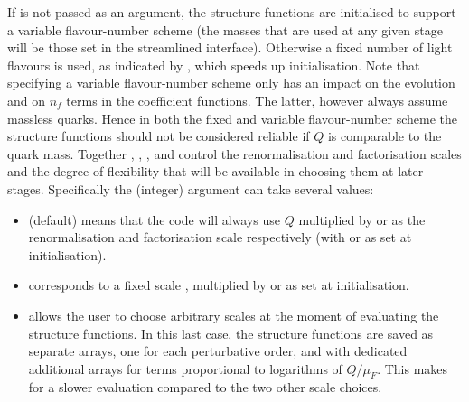 If  is not passed as an argument, the structure functions
are initialised to support a variable flavour-number scheme (the
masses that are used at any given stage will be those set in the
streamlined interface).
%
Otherwise a fixed number of light flavours is used, as indicated by
, which speeds up initialisation.
%
Note that specifying a variable flavour-number scheme only has an
impact on the evolution and on $n_f$ terms in the coefficient
functions.
%
The latter, however always assume massless quarks.
%
Hence in both the fixed and variable flavour-number scheme the
structure functions should not be considered reliable if  $Q$ is comparable to the quark mass.
Together , , , and  control
the renormalisation and factorisation scales and the degree of
flexibility that will be available in choosing them at later stages.
%
Specifically the (integer) 
argument can take several values:
\begin{itemize}
\item {} (default) means that the code will always
  use $Q$ multiplied by  or  as the renormalisation
  and factorisation scale respectively (with  or  as
  set at initialisation).
\item {} corresponds to a fixed scale
  , multiplied by  or  as set at
  initialisation.
\item {} allows the user to choose
  arbitrary scales at the moment of evaluating the structure
  functions.
  In this last case, the structure functions are saved as separate arrays, 
  one for each perturbative order, and with dedicated additional arrays
  for terms proportional to logarithms of $Q/\mu_F$. 
  This makes for a slower evaluation compared to the two other
  scale choices.
\end{itemize}
%


